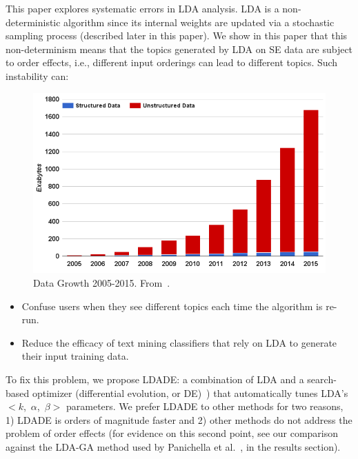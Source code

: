 \documentclass[twocolumn,5p,sort&compress]{elsarticle}
\newcommand{\bi}{\begin{itemize}}
\newcommand{\ei}{\end{itemize}}
\theoremstyle{break}
\begin{document}
This paper explores systematic errors in LDA analysis.
LDA is a non-deterministic algorithm since its internal weights are updated via a stochastic sampling process (described
later in this paper).
We show in this paper that this non-determinism means that the  topics generated by LDA on
SE data are subject to order effects, i.e., different input orderings
can lead to different topics.
Such instability can:
\begin{figure}[!b]
  \captionsetup{justification=centering}
  \includegraphics[width=\linewidth]{./fig/data.png}
  \caption{Data Growth 2005-2015. From~\cite{nadkarni2014structured}.}
  \label{fig: data}
\end{figure}

\bi
\item
  Confuse users when they see different topics each time
the algorithm is re-run.
\item
  Reduce the efficacy of text mining classifiers that rely on LDA to
  generate their input training data.
\ei
To fix this problem,
we propose LDADE: a  combination of LDA and a search-based optimizer (differential evolution, or DE)~\cite{storn1997differential})
that automatically tunes LDA's \mbox{$<k$, $\alpha$, $\beta>$} parameters. We prefer LDADE to other methods for two reasons, 1) LDADE is orders of magnitude faster and 2) other methods do not address the problem of order effects (for evidence on this second point,
see our  comparison against the LDA-GA method used by Panichella et al.~\cite{panichella2013effectively}, in the results section).
\end{document}
